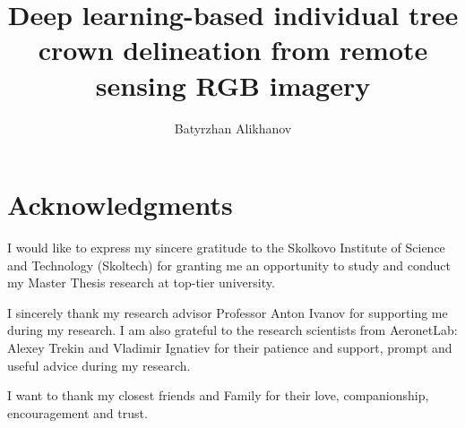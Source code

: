 
\title{Deep learning-based individual tree crown delineation  from remote sensing RGB imagery}

\author{Batyrzhan Alikhanov}







\maketitle
\rusmaketitle

\setcounter{savepage}{\thepage}
\begin{abstractpage}

\end{abstractpage}

%  

\section*{\centering Acknowledgments}

I would like to express my sincere gratitude to the Skolkovo Institute of Science and Technology (Skoltech) for granting me an opportunity to study and conduct my Master Thesis research at top-tier university. 

I sincerely thank my research advisor Professor Anton Ivanov for supporting me during my research. I am also grateful to the research scientists from AeronetLab: Alexey Trekin and Vladimir Ignatiev for their patience and support, prompt and useful advice during my research.  

I want to thank my closest friends and Family for their love, companionship, encouragement and trust.

